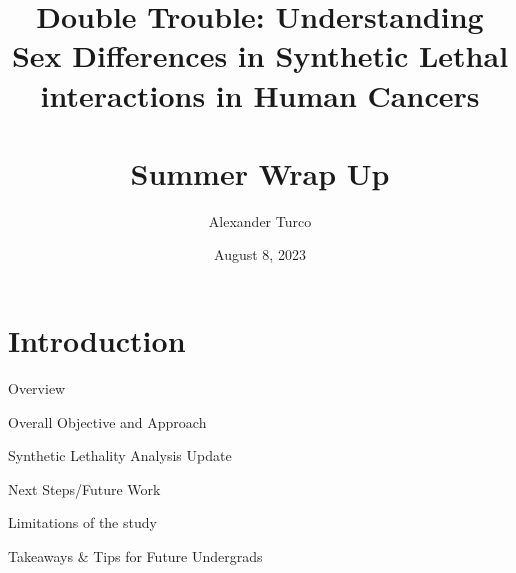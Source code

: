 \documentclass{beamer}
\title[BEAP Dec 2022]{Double Trouble: Understanding Sex Differences in Synthetic Lethal interactions in Human Cancers \\~\\ Summer Wrap Up}
\author{Alexander Turco}
\date{August 8, 2023}
\begin{document}
	
	\section{Introduction}
	\begin{frame}
		\titlepage 
		\begin{center}
		\end{center}
	\end{frame}
	
	\logo{}
	
	\begin{frame}{Overview}
		
		\begin{center}
		\begin{minipage}{6cm}
				
		  		\begin{block}{} Overall Objective and Approach \end{block}
		  		\begin{block}{} Synthetic Lethality Analysis Update \end{block}
		  		\begin{block}{} Next Steps/Future Work \end{block}
		  		\begin{block}{} Limitations of the study \end{block}
		  		\begin{block}{} Takeaways \& Tips for Future Undergrads \end{block}

		\end{minipage}
		\end{center}
	
	\end{frame}
	
	
\end{document}
